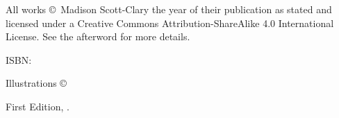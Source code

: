 \singlespacing
\thispagestyle{empty}
\null
\vfill
{\small\parindent0pt
\noindent All works \copyright\ Madison Scott-Clary the year of their publication as stated and licensed under a Creative Commons Attribution-ShareAlike 4.0 International License. See the afterword for more details.

\vspace{1ex}

ISBN: \ISBN

\vspace{1ex}

\emph{\Title}

\vspace{1ex}

Illustrations \copyright\ \Year\ \Illustrator\\
\IllustratorWeb

\vspace{1ex}

First Edition, \Year.

\EditionsList
}

\cleardoublepage
